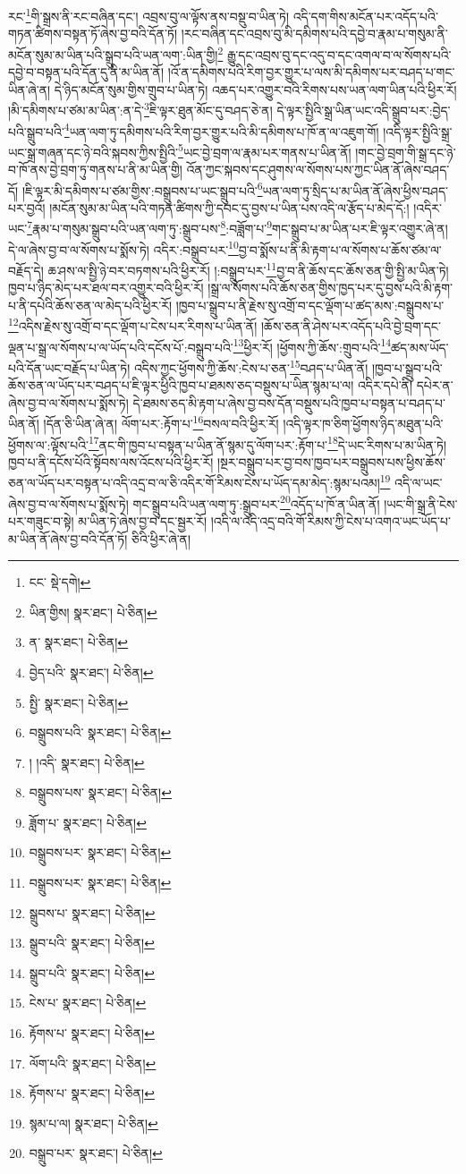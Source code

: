 རང་\footnote{ངང་  སྡེ་དགེ། }གི་སྒྲས་ནི་རང་བཞིན་དང་། འབྲས་བུ་ལ་ལྟོས་ནས་བསྡུ་བ་ཡིན་ཏེ། འདི་དག་གིས་མངོན་པར་འདོད་པའི་གཏན་ཚིགས་བསྟན་ཏོ་ཞེས་བྱ་བའི་དོན་ཏོ། །རང་བཞིན་དང་འབྲས་བུ་མི་དམིགས་པའི་དབྱེ་བ་རྣམ་པ་གསུམ་ནི་མངོན་སུམ་མ་ཡིན་པའི་སྒྲུབ་པའི་ཡན་ལག་:ཡིན་གྱི།\footnote{ཡིན་གྱིས།  སྣར་ཐང་།  པེ་ཅིན། } རྒྱུ་དང་འབྲས་བུ་དང་འདུ་བ་དང་འགལ་བ་ལ་སོགས་པའི་དབྱེ་བ་བསྟན་པའི་དོན་དུ་ནི་མ་ཡིན་ནོ། །འོ་ན་དམིགས་པའི་རིག་བྱར་གྱུར་པ་ལས་མི་དམིགས་པར་བཤད་པ་གང་ཡིན་ཞེ་ན། དེ་ཉིད་མངོན་སུམ་གྱིས་གྲུབ་པ་ཡིན་ཏེ། འཆད་པར་འགྱུར་བའི་རིགས་པས་ཡན་ལག་ཡིན་པའི་ཕྱིར་རོ། །མི་དམིགས་པ་ཙམ་མ་ཡིན་:ན་དེ་\footnote{ན་  སྣར་ཐང་།  པེ་ཅིན། }ཇི་ལྟར་ཐུན་མོང་དུ་བཤད་ཅེ་ན། དེ་ལྟར་སྤྱིའི་སྒྲ་ཡིན་ཡང་འདི་སྒྲུབ་པར་:བྱེད་པའི་སྒྲུབ་པའི་\footnote{བྱེད་པའི་  སྣར་ཐང་།  པེ་ཅིན། }ཡན་ལག་ཏུ་དམིགས་པའི་རིག་བྱར་གྱུར་པའི་མི་དམིགས་པ་ཁོ་ན་ལ་འཇུག་གོ། །འདི་ལྟར་སྤྱིའི་སྒྲ་ཡང་སྒྲ་གཞན་དང་ཉེ་བའི་སྐབས་ཀྱིས་སྤྱིའི་\footnote{སྤྱི་  སྣར་ཐང་།  པེ་ཅིན། }ཡང་བྱེ་བྲག་ལ་རྣམ་པར་གནས་པ་ཡིན་ནོ། །གང་བྱེ་བྲག་གི་སྒྲ་དང་ཉེ་བ་ཁོ་ནས་བྱེ་བྲག་ཏུ་གནས་པ་ནི་མ་ཡིན་གྱི། འོན་ཀྱང་སྐབས་དང་ཤུགས་ལ་སོགས་པས་ཀྱང་ཡིན་ནོ་ཞེས་བཤད་དོ། །ཇི་ལྟར་མི་དམིགས་པ་ཙམ་གྱིས་:བསྒྲུབས་པ་ཡང་སྒྲུབ་པའི་\footnote{བསྒྲུབས་པའི་  སྣར་ཐང་།  པེ་ཅིན། }ཡན་ལག་ཏུ་སྲིད་པ་མ་ཡིན་ནོ་ཞེས་ཕྱིས་བཤད་པར་བྱའོ། །མངོན་སུམ་མ་ཡིན་པའི་གཏན་ཚིགས་ཀྱི་དབང་དུ་བྱས་པ་ཡིན་པས་འདི་ལ་རྩོད་པ་མེད་དོ:། །འདིར་ཡང་\footnote{། །འདི་  སྣར་ཐང་།  པེ་ཅིན། }རྣམ་པ་གསུམ་སྒྲུབ་པའི་ཡན་ལག་ཏུ་:སྒྲུབ་པས་\footnote{བསྒྲུབས་པས་  སྣར་ཐང་།  པེ་ཅིན། }:བཟློག་པ་\footnote{ཟློག་པ་  སྣར་ཐང་།  པེ་ཅིན། }གང་སྒྲུབ་པ་མ་ཡིན་པར་ཇི་ལྟར་འགྱུར་ཞེ་ན། དེ་ལ་ཞེས་བྱ་བ་ལ་སོགས་པ་སྨོས་ཏེ། འདིར་:བསྒྲུབ་པར་\footnote{བསྒྲུབས་པར་  སྣར་ཐང་།  པེ་ཅིན། }བྱ་བ་སྨོས་པ་ནི་མི་རྟག་པ་ལ་སོགས་པ་ཆོས་ཙམ་ལ་བརྗོད་དེ། ཆ་ཤས་ལ་སྤྱི་ཉེ་བར་བཏགས་པའི་ཕྱིར་རོ། །:བསྒྲུབ་པར་\footnote{བསྒྲུབས་པར་  སྣར་ཐང་།  པེ་ཅིན། }བྱ་བ་ནི་ཆོས་དང་ཆོས་ཅན་གྱི་སྤྱི་མ་ཡིན་ཏེ། ཁྱབ་པ་ཉིད་མེད་པར་ཐལ་བར་འགྱུར་བའི་ཕྱིར་རོ། །སྒྲ་ལ་སོགས་པའི་ཆོས་ཅན་གྱིས་ཁྱད་པར་དུ་བྱས་པའི་མི་རྟག་པ་ནི་དཔེའི་ཆོས་ཅན་ལ་མེད་པའི་ཕྱིར་རོ། །ཁྱབ་པ་སྒྲུབ་པ་ནི་རྗེས་སུ་འགྲོ་བ་དང་ལྡོག་པ་ཚད་མས་:བསྒྲུབས་པ་\footnote{སྒྲུབས་པ་  སྣར་ཐང་།  པེ་ཅིན། }འདིས་རྗེས་སུ་འགྲོ་བ་དང་ལྡོག་པ་ངེས་པར་རིགས་པ་ཡིན་ནོ། །ཆོས་ཅན་ནི་ཤེས་པར་འདོད་པའི་བྱེ་བྲག་དང་ལྡན་པ་སྒྲ་ལ་སོགས་པ་ལ་ཡོད་པའི་དངོས་པོ་:བསྒྲུབ་པའི་\footnote{སྒྲུབ་པའི་  སྣར་ཐང་།  པེ་ཅིན། }ཕྱིར་རོ། །ཕྱོགས་ཀྱི་ཆོས་:གྲུབ་པའི་\footnote{སྒྲུབ་པའི་  སྣར་ཐང་།  པེ་ཅིན། }ཚད་མས་ཡོད་པའི་དོན་ཡང་བརྗོད་པ་ཡིན་ཏེ། འདིས་ཀྱང་ཕྱོགས་ཀྱི་ཆོས་:ངེས་པ་ཅན་\footnote{ངེས་པ་  སྣར་ཐང་།  པེ་ཅིན། }བཤད་པ་ཡིན་ནོ། །ཁྱབ་པ་སྒྲུབ་པའི་ཆོས་ཅན་ལ་ཡོད་པར་བཤད་པ་ཇི་ལྟར་ཕྱིའི་ཁྱབ་པ་ཐམས་ཅད་བསྡུས་པ་ཡིན་སྙམ་པ་ལ། འདིར་དཔེ་ནི། དཔེར་ན་ཞེས་བྱ་བ་ལ་སོགས་པ་སྨོས་ཏེ། དེ་ཐམས་ཅད་མི་རྟག་པ་ཞེས་བྱ་བས་དོན་བསྡུས་པའི་ཁྱབ་པ་བསྟན་པ་བཤད་པ་ཡིན་ནོ། །དོན་ཅི་ཡིན་ཞེ་ན། ལོག་པར་:རྟོག་པ་\footnote{རྟོགས་པ་  སྣར་ཐང་།  པེ་ཅིན། }བསལ་བའི་ཕྱིར་རོ། །འདི་ལྟར་ཁ་ཅིག་ཕྱོགས་ཉིད་མཐུན་པའི་ཕྱོགས་ལ་:ལྟོས་པའི་\footnote{ལོག་པའི་  སྣར་ཐང་།  པེ་ཅིན། }ནང་གི་ཁྱབ་པ་བསྟན་པ་ཡིན་ནོ་སྙམ་དུ་ལོག་པར་:རྟོག་པ་\footnote{རྟོགས་པ་  སྣར་ཐང་།  པེ་ཅིན། }དེ་ཡང་རིགས་པ་མ་ཡིན་ཏེ། ཁྱབ་པ་ནི་དངོས་པོའི་སྟོབས་ལས་འོངས་པའི་ཕྱིར་རོ། །སྔར་བསྒྲུབ་པར་བྱ་བས་ཁྱབ་པར་བསྒྲུབས་པས་ཕྱིས་ཆོས་ཅན་ལ་ཡོད་པར་བསྟན་པ་འདི་འདྲ་བ་ལ་ཅི་འདིར་གོ་རིམས་ངེས་པ་ཡོད་དམ་མེད་:སྙམ་པའམ།\footnote{སྙམ་པ་ལ།  སྣར་ཐང་།  པེ་ཅིན། } འདི་ལ་ཡང་ཞེས་བྱ་བ་ལ་སོགས་པ་སྨོས་ཏེ། གང་སྒྲུབ་པའི་ཡན་ལག་ཏུ་:སྒྲུབ་པར་\footnote{བསྒྲུབ་པར་  སྣར་ཐང་།  པེ་ཅིན། }འདོད་པ་ཁོ་ན་ཡིན་ནོ། །ཡང་གི་སྒྲ་ནི་ངེས་པར་གཟུང་བ་སྟེ། མ་ཡིན་ཏེ་ཞེས་བྱ་བ་དང་སྦྱར་རོ། །འདི་ལ་འདི་འདྲ་བའི་གོ་རིམས་ཀྱི་ངེས་པ་འགའ་ཡང་ཡོད་པ་མ་ཡིན་ནོ་ཞེས་བྱ་བའི་དོན་ཏོ། ཅིའི་ཕྱིར་ཞེ་ན། 